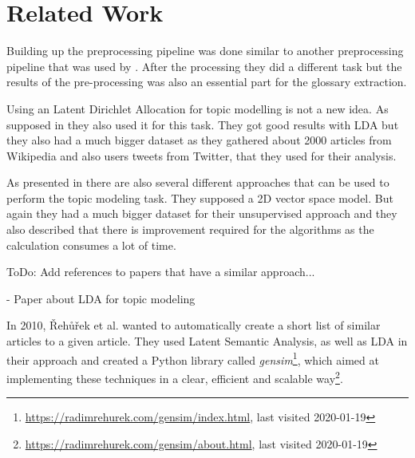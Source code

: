 \section{Related Work} %
\label{sec:related_work}

Building up the preprocessing pipeline was done similar to another preprocessing pipeline that was used by \cite{gemkow_automatic_2018}. After the processing they did a different task but the results of the pre-processing was also an essential part for the glossary extraction.

Using an Latent Dirichlet Allocation for topic modelling is not a new idea. As supposed in \cite{zhou_tong_text_2016} they also used it for this task. They got good results with LDA but they also had a much bigger dataset as they gathered about 2000 articles from Wikipedia and also users tweets from Twitter, that they used for their analysis.

As presented in \cite{george_unsupervised_2018} there are also several different approaches that can be used to perform the topic modeling task. They supposed a 2D vector space model. But again they had a much bigger dataset for their unsupervised approach and they also described that there is improvement required for the algorithms as the calculation consumes a lot of time.


\colorbox{yellow!30}{ToDo:} Add references to papers that have a similar approach...

- Paper about LDA for topic modeling

In 2010, {\v R}eh{\r u}{\v r}ek et al. wanted to automatically create a short list of similar articles to a given article\cite{rehurek_software_2010}. They used Latent Semantic Analysis, as well as LDA in their approach and created a Python library called \emph{gensim}\footnote{\url{https://radimrehurek.com/gensim/index.html}, last visited 2020-01-19\label{fn:gensim_website}}, which aimed at implementing these techniques in a clear, efficient and scalable way\footnote{\url{https://radimrehurek.com/gensim/about.html}, last visited 2020-01-19}.